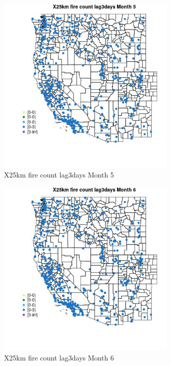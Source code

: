 \begin{figure} 
\centering  
\includegraphics[width=0.77\textwidth]{Code_Outputs/Report_ML_input_PM25_Step4_part_e_de_duplicated_aves_compiled_2019-05-14wNAs_MapObsMo5X25km_fire_count_lag3days.jpg} 
\caption{\label{fig:Report_ML_input_PM25_Step4_part_e_de_duplicated_aves_compiled_2019-05-14wNAsMapObsMo5X25km_fire_count_lag3days}X25km fire count lag3days Month 5} 
\end{figure} 
 

\begin{figure} 
\centering  
\includegraphics[width=0.77\textwidth]{Code_Outputs/Report_ML_input_PM25_Step4_part_e_de_duplicated_aves_compiled_2019-05-14wNAs_MapObsMo6X25km_fire_count_lag3days.jpg} 
\caption{\label{fig:Report_ML_input_PM25_Step4_part_e_de_duplicated_aves_compiled_2019-05-14wNAsMapObsMo6X25km_fire_count_lag3days}X25km fire count lag3days Month 6} 
\end{figure} 
 

